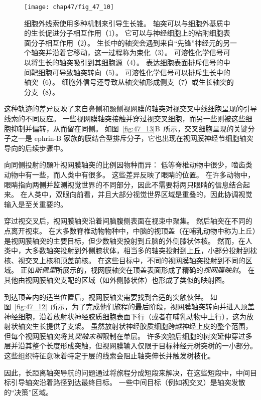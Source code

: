 \begin{figure}[htbp]
	\centering
	\texttt{[image: chap47/fig\_47\_10]}
	\caption{细胞外线索使用多种机制来引导生长锥。
		轴突可以与细胞外基质中的生长促进分子相互作用（1）。
		它可以与神经细胞上的粘附细胞表面分子相互作用（2）。
		生长中的轴突会遇到来自“先锋”神经元的另一个轴突并沿着它移动，这一过程称为束化（3）。
		可溶性化学信号可以将生长的轴突吸引到其细胞源（4）。
		表达细胞表面排斥信号的中间靶细胞可导致轴突转向（5）。
		可溶性化学信号可以排斥生长中的轴突（6）。
		细胞外信号还导致从轴突轴形成侧支（7）或生长轴突的分支（8）。}
	\label{fig:47_10}
\end{figure}


这种轨迹的差异反映了来自鼻侧和颞侧视网膜的轴突对视交叉中线细胞呈现的引导线索的不同反应。
一些视网膜轴突接触并穿过视交叉细胞，而另一些则被这些细胞抑制并偏转，从而留在同侧。
如图~\ref{fig:47_13}B~所示，交叉细胞呈现的关键分子之一是 ephrin-B 家族的膜结合型排斥分子，它也出现在视网膜神经节细胞轴突导向的后续步骤中。


向同侧投射的颞叶视网膜轴突的比例因物种而异：
低等脊椎动物中很少，啮齿类动物中有一些，而人类中有很多。
这些差异反映了眼睛的位置。
在许多动物中，眼睛指向两侧并监测视觉世界的不同部分，因此不需要将两只眼睛的信息结合起来。
在人类中，双眼向前看，并且大部分视觉世界区域是重叠的，因此协调视觉输入是至关重要的。


穿过视交叉后，视网膜轴突沿着间脑腹侧表面在视束中聚集。
然后轴突在不同的点离开视束。
在大多数脊椎动物物种中，中脑的视顶盖（在哺乳动物中称为上丘）是视网膜轴突的主要目标，但少数轴突投射到丘脑的外侧膝状体核。
然而，在人类中，大多数轴突投射到外侧膝状体，相当多的轴突投射到上丘，小部分投射到枕核、视交叉上核和顶盖前核。
在这些目标中，不同的视网膜轴突投射到不同的区域。
正如\textit{斯佩里}所展示的，视网膜轴突在顶盖表面形成了精确的\textit{视网膜映射}。
在其他由视网膜轴突支配的区域（如外侧膝状体）也形成了类似的映射图。


到达顶盖内的适当位置后，视网膜轴突需要找到合适的突触伙伴。
如图~\ref{fig:47_12}~所示，为了完成他们旅程的最后阶段，视网膜轴突转向并进入顶盖神经细胞，沿着放射状神经胶质细胞表面下行（或者在哺乳动物中上行），这为放射状轴突生长提供了支架。
虽然放射状神经胶质细胞跨越神经上皮的整个范围，但每个视网膜轴突将其\textit{突触末稍}限制在单层。
许多突触后细胞的树突延伸穿过多层并沿其整个长度形成突触，但视网膜输入仅限于目标神经元树突树的一小部分。
这些组织特征意味着特定于层的线索会阻止轴突伸长并触发树枝化。


因此，长距离轴突导航的问题通过将旅程分成短段来解决，在这些短段中，中间目标引导轴突沿着路径到达最终目标。
一些中间目标（例如视交叉）是轴突发散的“决策”区域。


